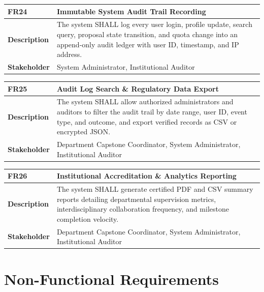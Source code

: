 \begin{table}[H]
\centering
\small
\begin{tabularx}{\textwidth}{|l|X|}
\hline
\rowcolor{lightgray!40} \textbf{FR24} & \textbf{Immutable System Audit Trail Recording} \\ \hline
\textbf{Description} & The system SHALL log every user login, profile update, search query, proposal state transition, and quota change into an append-only audit ledger with user ID, timestamp, and IP address. \\ \hline
\textbf{Stakeholder} & System Administrator, Institutional Auditor \\ \hline
\end{tabularx}
\end{table}

\begin{table}[H]
\centering
\small
\begin{tabularx}{\textwidth}{|l|X|}
\hline
\rowcolor{lightgray!40} \textbf{FR25} & \textbf{Audit Log Search \& Regulatory Data Export} \\ \hline
\textbf{Description} & The system SHALL allow authorized administrators and auditors to filter the audit trail by date range, user ID, event type, and outcome, and export verified records as CSV or encrypted JSON. \\ \hline
\textbf{Stakeholder} & Department Capstone Coordinator, System Administrator, Institutional Auditor \\ \hline
\end{tabularx}
\end{table}

\begin{table}[H]
\centering
\small
\begin{tabularx}{\textwidth}{|l|X|}
\hline
\rowcolor{lightgray!40} \textbf{FR26} & \textbf{Institutional Accreditation \& Analytics Reporting} \\ \hline
\textbf{Description} & The system SHALL generate certified PDF and CSV summary reports detailing departmental supervision metrics, interdisciplinary collaboration frequency, and milestone completion velocity. \\ \hline
\textbf{Stakeholder} & Department Capstone Coordinator, System Administrator, Institutional Auditor \\ \hline
\end{tabularx}
\end{table}

\section{Non-Functional Requirements}
\label{sec:non_functional_requirements}

